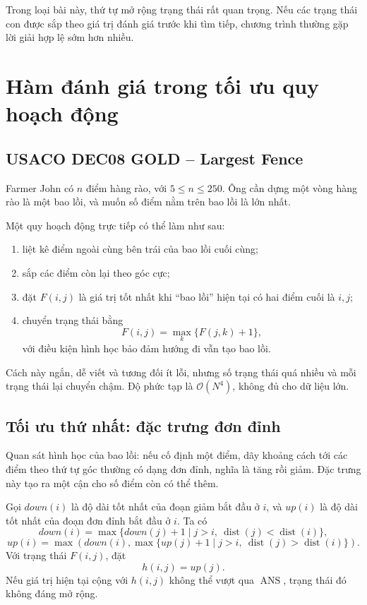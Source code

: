 \documentclass[11pt]{article}
\newcommand{\Oh}{\mathcal{O}}
\newcommand{\dist}{\operatorname{dist}}
\newcommand{\ANS}{\operatorname{ANS}}
\begin{document}
Trong loại bài này, thứ tự mở rộng trạng thái rất quan trọng. Nếu các trạng
thái con được sắp theo giá trị đánh giá trước khi tìm tiếp, chương trình
thường gặp lời giải hợp lệ sớm hơn nhiều.

\section{Hàm đánh giá trong tối ưu quy hoạch động}

\subsection*{USACO DEC08 GOLD -- Largest Fence}

Farmer John có \(n\) điểm hàng rào, với \(5\le n\le 250\). Ông cần dựng một
vòng hàng rào là một bao lồi, và muốn số điểm nằm trên bao lồi là lớn nhất.

Một quy hoạch động trực tiếp có thể làm như sau:
\begin{enumerate}
  \item liệt kê điểm ngoài cùng bên trái của bao lồi cuối cùng;
  \item sắp các điểm còn lại theo góc cực;
  \item đặt \(F(i,j)\) là giá trị tốt nhất khi ``bao lồi'' hiện tại có hai điểm
  cuối là \(i,j\);
  \item chuyển trạng thái bằng
  \[
    F(i,j)=\max_k\{F(j,k)+1\},
  \]
  với điều kiện hình học bảo đảm hướng đi vẫn tạo bao lồi.
\end{enumerate}

Cách này ngắn, dễ viết và tương đối ít lỗi, nhưng số trạng thái quá nhiều và
mỗi trạng thái lại chuyển chậm. Độ phức tạp là \(\Oh(N^4)\), không đủ cho dữ
liệu lớn.

\subsection*{Tối ưu thứ nhất: đặc trưng đơn đỉnh}

Quan sát hình học của bao lồi: nếu cố định một điểm, dãy khoảng cách tới các
điểm theo thứ tự góc thường có dạng đơn đỉnh, nghĩa là tăng rồi giảm. Đặc trưng
này tạo ra một cận cho số điểm còn có thể thêm.

Gọi \(\mathit{down}(i)\) là độ dài tốt nhất của đoạn giảm bắt đầu ở \(i\), và
\(\mathit{up}(i)\) là độ dài tốt nhất của đoạn đơn đỉnh bắt đầu ở \(i\). Ta có
\[
  \mathit{down}(i)=
  \max\{\mathit{down}(j)+1\mid j>i,\ \dist(j)<\dist(i)\},
\]
\[
  \mathit{up}(i)=
  \max\left(
    \mathit{down}(i),
    \max\{\mathit{up}(j)+1\mid j>i,\ \dist(j)>\dist(i)\}
  \right).
\]
Với trạng thái \(F(i,j)\), đặt
\[
  h(i,j)=\mathit{up}(j).
\]
Nếu giá trị hiện tại cộng với \(h(i,j)\) không thể vượt qua \(\ANS\), trạng
thái đó không đáng mở rộng.
\end{document}
